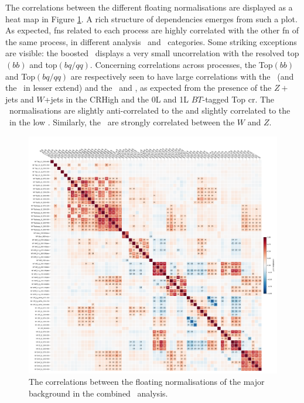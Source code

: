 The correlations between the different floating normalisations are displayed as a heat map in Figure \ref{fig:FNcorr}. A rich structure of dependencies emerges from such a plot. As expected, \glspl{fn} related to each process are highly correlated with the other \gls{fn} of the same process, in different analysis \ptv\ and \nj\ categories. Some striking exceptions are visible: the boosted \ttb\ displays a very small uncorrelation with the resolved top$(bb)$ and top$(bq/qq)$. Concerning correlations across processes, the Top$(bb)$ and Top$(bq/qq)$ are respectively seen to have large correlations with the \zhf\ (and the \whf\ in lesser extend) and the \wmf\ and \zmf, as expected from the presence of the $Z+$jets and $W$+jets in the CRHigh and the 0L and 1L $BT$-tagged Top \gls{cr}. The \whf\ normalisations are slightly anti-correlated to the \vlf and slightly correlated to the \zhf\ in the low \nj. Similarly, the \vlf\ are strongly correlated between the $W$ and $Z$.
  
\begin{figure}[h!]
    \hspace{-1cm}
    \includegraphics[width=1.1\textwidth]{Images/VH/Fit/fromSlides/SMVHbbcc_2022_MVA_mc16ade_v14.fit_012_fullRes_VHbb_fit_012_012_mc16ade_Systs_mva_VHbbcc_AsimovFit_conditional_mu1_Cov_BTag}
    \caption{The correlations between the floating normalisations of the major background in the combined \vhbc\ analysis.}
    \label{fig:FNcorr}
\end{figure} 

